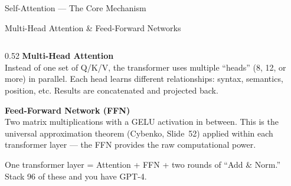 \begin{frame}[shrink=8]{Self-Attention --- The Core Mechanism}
\end{frame}

\begin{frame}[shrink=16]{Multi-Head Attention \& Feed-Forward Networks}

  \begin{columns}[T]
    \begin{column}{0.52\textwidth}
      \textbf{Multi-Head Attention}\\[3pt]
      {\small Instead of one set of Q/K/V, the transformer uses multiple
      ``heads'' (8, 12, or more) in parallel. Each head learns different
      relationships: syntax, semantics, position, etc.
      Results are concatenated and projected back.}

      \vspace{0.5em}
      \textbf{Feed-Forward Network (FFN)}\\[3pt]
      {\small Two matrix multiplications with a GELU activation in between.
      This is the universal approximation theorem
      (Cybenko, Slide~52) applied within each transformer layer ---
      the FFN provides the raw computational power.}

      \vspace{0.5em}
      \begin{insightbox}
        \small One transformer layer = Attention + FFN + two rounds of
        ``Add \& Norm.'' Stack 96 of these and you have GPT-4.
      \end{insightbox}
    \end{column}


\end{columns}
\end{frame}
